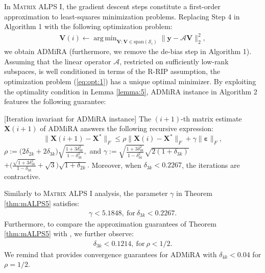 \documentclass[twocolumn]{svjour3}
\newcommand{\vectornormbig}[1]{\big\|#1\big\|}
\newcommand{\obs}{\boldsymbol{y}}
\newcommand{\sensing}{\boldsymbol{\mathcal{A}}}
\newcommand{\signal}{\boldsymbol{X}}
\newcommand{\bestsignal}{\boldsymbol{X}^\ast}
\newcommand{\noise}{\boldsymbol{\varepsilon}}
\newcommand{\rank}{k}
\DeclareMathOperator*{\argmin}{arg\,min}
\begin{document}
In \textsc{Matrix ALPS I}, the gradient descent steps constitute a first-order approximation to least-squares minimization problems. Replacing Step 4 in Algorithm 1 with the following optimization problem:
\begin{align}
\boldsymbol{V}(i) \leftarrow \argmin_{\boldsymbol{V}: \boldsymbol{V} \in \text{span}(\mathcal{S}_i)} \vectornormbig{\obs - \sensing \boldsymbol{V}}_2^2, \label{eq:opt:1}
\end{align}
we obtain ADMiRA (furthermore, we remove the de-bias step in Algorithm 1). Assuming that the linear operator $ \sensing $, restricted on sufficiently low-rank subspaces, is well conditioned in terms of the R-RIP assumption, the optimization problem (\ref{eq:opt:1}) has a unique optimal minimizer. By exploiting the optimality condition in Lemma \ref{lemma:5}, ADMiRA instance in Algorithm 2 features the following guarantee:

\begin{theorem}\label{thm:mALPS5}[Iteration invariant for ADMiRA instance] The $(i+1)$-th matrix estimate $\signal(i+1)$ of ADMiRA answers the following recursive expression:
\begin{equation}\nonumber
\vectornormbig{\signal(i+1) - \bestsignal}_F \leq \rho \vectornormbig{\signal(i) - \bestsignal}_F + \gamma \vectornormbig{\noise}_F,
\end{equation} $\rho := \big(2\delta_{2\rank} + 2\delta_{3\rank}\big)\sqrt{\frac{1+3\delta_{3\rank}^2}{1-\delta_{3\rank}^2}}, $ and $\gamma := \sqrt{\frac{1+3\delta_{3\rank}^2}{1-\delta_{3\rank}^2}} \sqrt{2(1+\delta_{3\rank})} $ $+ \Big(\frac{\sqrt{1+3\delta_{3\rank}^2}}{1-\delta_{3\rank}} + \sqrt{3}\Big)\sqrt{1+\delta_{2\rank}}. $ Moreover, when $\delta_{3\rank} < 0.2267 $, the iterations are contractive.
\end{theorem}

Similarly to \textsc{Matrix ALPS I} analysis, the parameter $ \gamma $ in Theorem \ref{thm:mALPS5} satisfies:
\begin{align}
\gamma < 5.1848, ~\text{for}~ \delta_{3\rank} < 0.2267. \nonumber
\end{align} Furthermore, to compare the approximation guarantees of Theorem \ref{thm:mALPS5} with \cite{admira2010}, we further observe:
\begin{align}
\delta_{3\rank} < 0.1214, ~\text{for}~ \rho < 1/2. \nonumber
\end{align} We remind that \cite{admira2010} provides convergence guarantees for ADMiRA with $ \delta_{4\rank} < 0.04 $ for $ \rho = 1/2 $.
\end{document}
